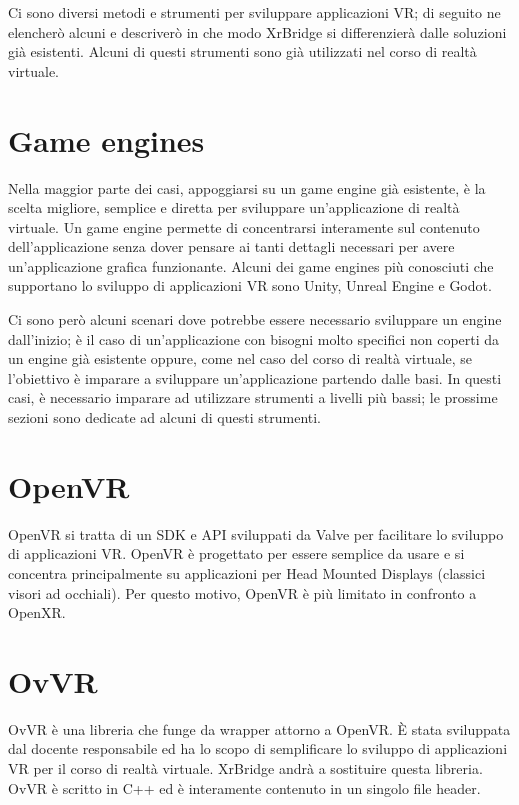 \documentclass[twoside]{supsistudent}
\begin{document}
Ci sono diversi metodi e strumenti per sviluppare applicazioni VR; di seguito ne elencherò alcuni e descriverò in che modo XrBridge si differenzierà dalle soluzioni già esistenti. Alcuni di questi strumenti sono già utilizzati nel corso di realtà virtuale.

\section{Game engines}

Nella maggior parte dei casi, appoggiarsi su un game engine già esistente, è la scelta migliore, semplice e diretta per sviluppare un'applicazione di realtà virtuale. Un game engine permette di concentrarsi interamente sul contenuto dell'applicazione senza dover pensare ai tanti dettagli necessari per avere un'applicazione grafica funzionante. Alcuni dei game engines più conosciuti che supportano lo sviluppo di applicazioni VR sono Unity, Unreal Engine e Godot.

Ci sono però alcuni scenari dove potrebbe essere necessario sviluppare un engine dall'inizio; è il caso di un'applicazione con bisogni molto specifici non coperti da un engine già esistente oppure, come nel caso del corso di realtà virtuale, se l'obiettivo è imparare a sviluppare un'applicazione partendo dalle basi. In questi casi, è necessario imparare ad utilizzare strumenti a livelli più bassi; le prossime sezioni sono dedicate ad alcuni di questi strumenti.

\section{OpenVR}

OpenVR si tratta di un SDK e API sviluppati da Valve per facilitare lo sviluppo di applicazioni VR. OpenVR è progettato per essere semplice da usare e si concentra principalmente su applicazioni per Head Mounted Displays (classici visori ad occhiali). Per questo motivo, OpenVR è più limitato in confronto a OpenXR.

\section{OvVR}

OvVR è una libreria che funge da wrapper attorno a OpenVR. È stata sviluppata dal docente responsabile ed ha lo scopo di semplificare lo sviluppo di applicazioni VR per il corso di realtà virtuale. XrBridge andrà a sostituire questa libreria. OvVR è scritto in C++ ed è interamente contenuto in un singolo file header.
\end{document}
